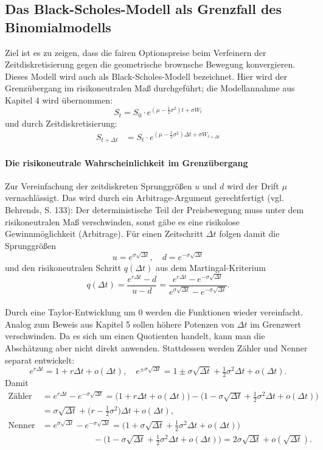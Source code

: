 \subsection{Das Black-Scholes-Modell als Grenzfall des Binomialmodells}
Ziel ist es zu zeigen, dass die fairen Optionspreise
beim Verfeinern der Zeitdiskretisierung gegen die geometrische brownsche Bewegung konvergieren.
Dieses Modell wird auch als Black-Scholes-Modell bezeichnet. Hier wird der Grenzübergang im risikoneutralen Maß durchgeführt;
die Modellannahme aus Kapitel 4 wird übernommen:
$$
S_t = S_0 \cdot e^{(\mu - \frac{1}{2}\sigma^2)t + \sigma W_t}
$$
und durch Zeitdiskretisierung:
$$
\begin{aligned}
S_{t+\Delta t} &= S_t \cdot e^{(\mu - \frac{1}{2}\sigma^2)\Delta t + \sigma W_{t+\Delta t}}
\end{aligned}
$$
\paragraph{Die risikoneutrale Wahrscheinlichkeit im Grenzübergang}
Zur Vereinfachung der zeitdiskreten Sprunggrößen $u$ und $d$ wird der Drift $\mu$ vernachlässigt.
Das wird durch ein Arbitrage-Argument gerechtfertigt (vgl. Behrends\cite{behrends}, S. 133):
Der deterministische Teil der Preisbewegung muss unter dem risikoneutralen Maß verschwinden, 
sonst gäbe es eine risikolose Gewinnmöglichkeit (Arbitrage). 
Für einen Zeitschritt $\Delta t$ folgen damit die Sprunggrößen
$$
u = e^{\sigma \sqrt{\Delta t}},\quad d = e^{-\sigma \sqrt{\Delta t}}
$$
und den risikoneutralen Schritt $q(\Delta t)$ aus dem Martingal-Kriterium
$$
q(\Delta t) = \frac{e^{r \Delta t} - d}{u - d}
= \frac{e^{r \Delta t} - e^{-\sigma \sqrt{\Delta t}}}{e^{\sigma \sqrt{\Delta t}} - e^{-\sigma \sqrt{\Delta t}}}.
$$
\\ Durch eine Taylor-Entwicklung um $0$ werden die Funktionen wieder vereinfacht. Analog zum Beweis aus Kapitel 5
sollen höhere Potenzen von $\Delta t$ im Grenzwert verschwinden. Da es sich um einen Quotienten handelt,
kann man die Abschätzung aber nicht direkt anwenden. Stattdessen werden Zähler und Nenner separat entwickelt:
$$
e^{r\Delta t} = 1 + r\Delta t + o(\Delta t),\quad
e^{\pm \sigma\sqrt{\Delta t}} = 1 \pm \sigma \sqrt{\Delta t} + \tfrac12 \sigma^2 \Delta t + o(\Delta t).
$$
Damit
$$
\begin{aligned}
\text{Zähler} &= e^{r \Delta t} - e^{-\sigma \sqrt{\Delta t}}
= \big(1 + r\Delta t + o(\Delta t)\big) - \big(1 - \sigma \sqrt{\Delta t} + \tfrac12 \sigma^2 \Delta t + o(\Delta t)\big) \\
&= \sigma \sqrt{\Delta t} + \big(r - \tfrac12 \sigma^2\big)\Delta t + o(\Delta t), \\
\text{Nenner} &= e^{\sigma \sqrt{\Delta t}} - e^{-\sigma \sqrt{\Delta t}}
= \big(1 + \sigma \sqrt{\Delta t} + \tfrac12 \sigma^2 \Delta t + o(\Delta t)\big) \\
&\qquad\qquad\qquad - \big(1 - \sigma \sqrt{\Delta t} + \tfrac12 \sigma^2 \Delta t + o(\Delta t)\big)
= 2\sigma \sqrt{\Delta t} + o(\sqrt{\Delta t}).
\end{aligned}
$$
